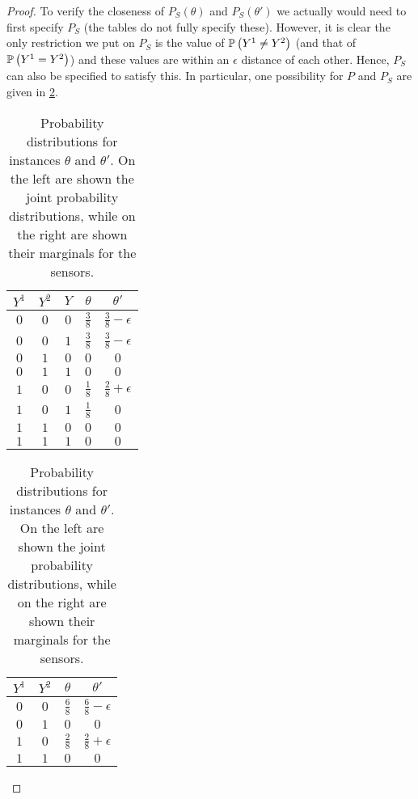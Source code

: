 \begin{proof}
To verify the closeness of $P_S(\theta)$ and $P_S(\theta')$ we actually 
would need to first specify $P_S$ (the tables do not fully specify these).
However, it is clear the only restriction we put on $P_S$ is the value of $\mathbb{P}\left(Y^1\ne Y^2\right)$ (and
that of $\mathbb{P}\left(Y^1=Y^2\right)$) and these values are within an $\epsilon$ distance of each other.
Hence, $P_S$ can also be specified to satisfy this. In particular, one possibility for $P$ and $P_S$ are given in \cref{tab:nonunif3}.
\bgroup
%
\begin{table}[]
	\centering
	\begin{tabular}{|c|c|c||c|c|}
		\hline
		$Y^1$ & $Y^2$ & $Y$ & $\theta$ & $\theta'$ \\ \hline\hline
		$0$ & $0$ & $0$ & $\frac38$ & $\frac38-\epsilon$ \\ \hline
		$0$ & $0$ & $1$ & $\frac38$ & $\frac38-\epsilon$ \\ \hline
		$0$ & $1$ & $0$ & $0         $ & $0                       $ \\ \hline
		$0$ & $1$ & $1$ & $0         $ & $0                       $ \\ \hline
		$1$ & $0$ & $0$ & $\frac18$ & $\frac28+\epsilon$ \\ \hline
		$1$ & $0$ & $1$ & $\frac18$ & $0                       $ \\ \hline
		$1$ & $1$ & $0$ & $0         $ & $0                       $ \\ \hline
		$1$ & $1$ & $1$ & $0         $ & $0                       $ \\ \hline
	\end{tabular}
	\mbox{}
	\hspace*{1.5in}
	\mbox{}
	\begin{tabular}{|c|c||c|c|}
		\hline
		$Y^1$ & $Y^2$ &$\theta$ & $\theta'$ \\ \hline\hline
		$0$ & $0$ & $\frac68$ & $\frac68-\epsilon$ \\ \hline
		$0$ & $1$ & $0         $ & $0                       $ \\ \hline
		$1$ & $0$ & $\frac28$ & $\frac28+\epsilon$ \\ \hline
		$1$ & $1$ & $0         $ & $0                       $ \\ \hline
	\end{tabular}
	
	\vspace*{0.1in}
	\caption{Probability distributions for instances $\theta$ and $\theta'$. On the left are shown the joint
		probability distributions, while on the right are shown their marginals
		for the sensors.}
	\label{tab:nonunif3}
\end{table}
\egroup


\end{proof}

